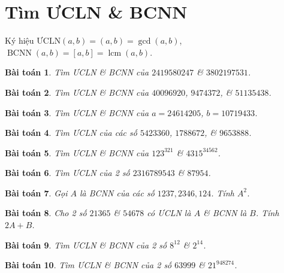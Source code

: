 \documentclass{article}
\newtheorem{baitoan}{Bài toán}
\begin{document}

\section{Tìm ƯCLN \& BCNN}
Ký hiệu $\mbox{ƯCLN}(a,b) = (a,b) = \operatorname{gcd}(a,b)$, $\operatorname{BCNN}(a,b) = [a,b] = \operatorname{lcm}(a,b)$.

\begin{baitoan}
	Tìm \emph{ƯCLN} \& \emph{BCNN} của $2419580247$ \& $3802197531$.
\end{baitoan}

\begin{baitoan}
	Tìm \emph{ƯCLN} \& \emph{BCNN} của $40096920$, $9474372$, \& $51135438$.
\end{baitoan}

\begin{baitoan}
	Tìm \emph{ƯCLN} \& \emph{BCNN} của $a = 24614205$, $b = 10719433$.
\end{baitoan}

\begin{baitoan}
	Tìm \emph{ƯCLN} của các số $5423360$, $1788672$, \& $9653888$.
\end{baitoan}

\begin{baitoan}
	Tìm \emph{ƯCLN} \& \emph{BCNN} của $123^{321}$ \& $4315^{34562}$.
\end{baitoan}

\begin{baitoan}
	Tìm \emph{ƯCLN} của 2 số $2316789543$ \& $87954$.
\end{baitoan}

\begin{baitoan}
	Gọi $A$ là \emph{BCNN} của các số $1237,2346,124$. Tính $A^2$.
\end{baitoan}

\begin{baitoan}
	Cho 2 số $21365$ \& $54678$ có \emph{ƯCLN} là $A$ \& \emph{BCNN} là $B$. Tính $2A + B$.
\end{baitoan}

\begin{baitoan}
	Tìm \emph{ƯCLN} \& \emph{BCNN} của 2 số $8^{12}$ \& $2^{14}$.
\end{baitoan}

\begin{baitoan}
	Tìm \emph{ƯCLN} \& \emph{BCNN} của 2 số $63999$ \& $21^{948274}$.
\end{baitoan}
\end{document}
